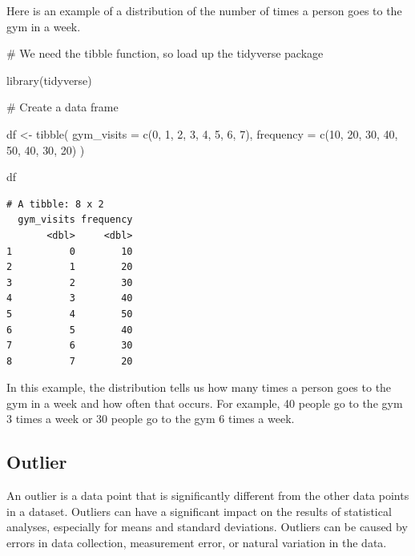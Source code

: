 \documentclass[
  letterpaper,
  DIV=11,
  numbers=noendperiod]{scrreprt}
\newenvironment{Shaded}{\begin{snugshade}}{\end{snugshade}}
\newcommand{\AttributeTok}[1]{\textcolor[rgb]{0.40,0.45,0.13}{#1}}
\newcommand{\CommentTok}[1]{\textcolor[rgb]{0.37,0.37,0.37}{#1}}
\newcommand{\DecValTok}[1]{\textcolor[rgb]{0.68,0.00,0.00}{#1}}
\newcommand{\FunctionTok}[1]{\textcolor[rgb]{0.28,0.35,0.67}{#1}}
\newcommand{\NormalTok}[1]{\textcolor[rgb]{0.00,0.23,0.31}{#1}}
\newcommand{\OtherTok}[1]{\textcolor[rgb]{0.00,0.23,0.31}{#1}}
\begin{document}
Here is an example of a distribution of the number of times a person
goes to the gym in a week.

\begin{Shaded}
\begin{Highlighting}[]
\CommentTok{\# We need the tibble function, so load up the tidyverse package}

\FunctionTok{library}\NormalTok{(tidyverse)}
\end{Highlighting}
\end{Shaded}

\begin{Shaded}
\begin{Highlighting}[]
\CommentTok{\# Create a data frame}

\NormalTok{df }\OtherTok{\textless{}{-}} \FunctionTok{tibble}\NormalTok{(}
  \AttributeTok{gym\_visits =} \FunctionTok{c}\NormalTok{(}\DecValTok{0}\NormalTok{, }\DecValTok{1}\NormalTok{, }\DecValTok{2}\NormalTok{, }\DecValTok{3}\NormalTok{, }\DecValTok{4}\NormalTok{, }\DecValTok{5}\NormalTok{, }\DecValTok{6}\NormalTok{, }\DecValTok{7}\NormalTok{),}
  \AttributeTok{frequency =} \FunctionTok{c}\NormalTok{(}\DecValTok{10}\NormalTok{, }\DecValTok{20}\NormalTok{, }\DecValTok{30}\NormalTok{, }\DecValTok{40}\NormalTok{, }\DecValTok{50}\NormalTok{, }\DecValTok{40}\NormalTok{, }\DecValTok{30}\NormalTok{, }\DecValTok{20}\NormalTok{)}
\NormalTok{)}

\NormalTok{df}
\end{Highlighting}
\end{Shaded}

\begin{verbatim}
# A tibble: 8 x 2
  gym_visits frequency
       <dbl>     <dbl>
1          0        10
2          1        20
3          2        30
4          3        40
5          4        50
6          5        40
7          6        30
8          7        20
\end{verbatim}

In this example, the distribution tells us how many times a person goes
to the gym in a week and how often that occurs. For example, 40 people
go to the gym 3 times a week or 30 people go to the gym 6 times a week.

\subsection*{Outlier}\label{outlier}

An outlier is a data point that is significantly different from the
other data points in a dataset. Outliers can have a significant impact
on the results of statistical analyses, especially for means and
standard deviations. Outliers can be caused by errors in data
collection, measurement error, or natural variation in the data.
\end{document}
